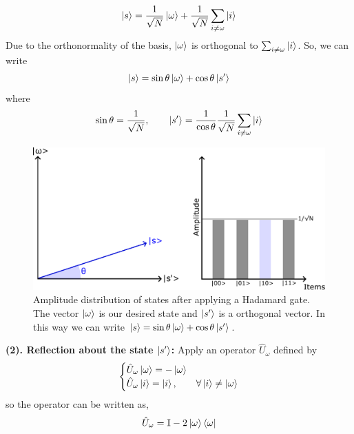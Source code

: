 \begin{equation}
    \ket{s} = \frac{1}{\sqrt{N}}\ket{\omega} + \frac{1}{\sqrt{N}}\sum_{i \neq \omega} \ket{i}
\end{equation}
Due to the orthonormality of the basis, $\ket{\omega}$ is orthogonal to $\sum_{i \neq \omega} \ket{i}$. So, we can write
\begin{equation}
    \ket{s} = \sin{\theta}\ket{\omega} + \cos{\theta}\ket{s'}
\end{equation}
where
\begin{equation}
    \sin{\theta} = \frac{1}{\sqrt{N}}, \quad\quad  \ket{s'} = \frac{1}{\cos{\theta}}\frac{1}{\sqrt{N}}\sum_{i\neq \omega}\ket{i}
\end{equation}
\begin{figure}[H]
    \centering
    \includegraphics[scale=0.55]{Figures/Grover_Step1.pdf}
    \caption{Amplitude distribution of states after applying a Hadamard gate. The vector $\ket{\omega}$ is our desired state and $\ket{s'}$ is a orthogonal vector. In this way we can write $\ket{s} = \sin{\theta}\ket{\omega} + \cos{\theta}\ket{s'}$.}
    \label{fig:Grover_step1}
\end{figure}
\textbf{(2). Reflection about the state $\ket{s'}$:} Apply an operator $\hat{U}_{\omega}$ defined by
\begin{equation}
     \begin{cases}
       \hat{U}_{\omega}\ket{\omega} = -\ket{\omega} \\
       \hat{U}_{\omega}\ket{i} = \ket{i}, &  \forall \ket{i}\neq \ket{\omega} \\
     \end{cases}
\end{equation}
so the operator can be written as,
\begin{equation}
    \hat{U}_{\omega} = \mathbb{I} - 2\ket{\omega}\bra{\omega}
\end{equation}
